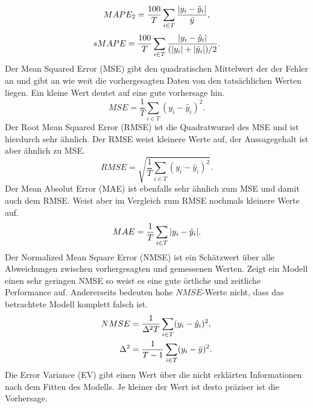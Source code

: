 \begin{equation}
MAPE_2= \frac{100}{T} \sum\limits_{i \in T} \frac{\abs{y_i-\hat{y}_i}}{\bar{y}},
\label{gl:MAPE_2}
\end{equation}
%
\begin{equation}
sMAPE= \frac{100}{T} \sum\limits_{i \in T} \frac{\abs{y_i-\hat{y}_i}}{(\abs{y_i} + \abs{\hat{y}_i}) / 2}.
\label{gl:sMAPE}
\end{equation}
%
Der Mean Squared Error (MSE) gibt den quadratischen Mittelwert der der Fehler an und gibt an wie weit die vorhergesagten Daten von den tatsächlichen Werten liegen. Ein kleine Wert deutet auf eine gute vorhersage hin.\,
\begin{equation}
MSE= \frac{1}{T} \sum\limits_{i \in T} (y_i-\hat{y}_i)^2.
\label{gl:MSE}
\end{equation}
%
%
Der Root Mean Squared Error (RMSE) ist die Quadratwurzel des MSE und ist hierdurch sehr ähnlich. Der RMSE weist kleinere Werte auf, der Aussagegehalt ist aber ähnlich zu MSE.
\begin{equation}
RMSE= \sqrt{ \frac{1}{T} \sum\limits_{i \in T} (y_i-\hat{y}_i)^2}.
\label{gl:RMSE}
\end{equation}
%
Der Mean Absolut Error (MAE) ist ebenfalls sehr ähnlich zum MSE und damit auch dem RMSE. Weist aber im Vergleich zum RMSE nochmals kleinere Werte auf.
\begin{equation}
MAE= \frac{1}{T} \sum\limits_{i \in T} \abs{y_i-\hat{y}_i}.
\label{gl:MAE}
\end{equation}
%
%
Der Normalized Mean Square Error (NMSE) ist ein Schätzwert über alle Abweichungen zwischen vorhergesagten und gemessenen Werten. Zeigt ein Modell einen sehr geringen NMSE so weist es eine gute örtliche und zeitliche Performance auf. Andererseits bedeuten hohe $NMSE$-Werte nicht, dass das betrachtete Modell komplett falsch ist.
\begin{gather}
\begin{aligned}
NMSE &= \frac{1}{\Delta^2 T} \sum\limits_{i \in T} (y_i-\hat{y}_i)^2,\\ 
\Delta^2 &= \frac{1}{T-1} \sum\limits_{i \in T} (y_i-\bar{y})^2.\\
\end{aligned}
\label{gl:NMSE}
\end{gather}
%
%
Die Error Variance (EV) gibt einen Wert über die nicht erklärten Informationen nach dem Fitten des Modells. Je kleiner der Wert ist desto präziser ist die Vorhersage.\,
